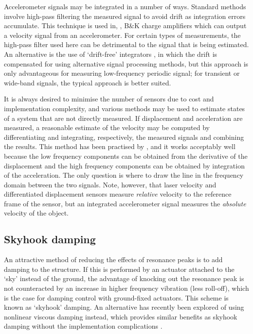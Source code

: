 Accelerometer signals may be integrated in a number of ways.
Standard methods involve high-pass filtering the measured signal to avoid drift as integration errors accumulate.
This technique is used in, \eg, B\&K charge amplifiers which can output a velocity signal from an accelerometer.
For certain types of measurements, the high-pass filter used here can be detrimental to the signal that is being estimated.
An alternative is the use of `drift-free' integrators \cite{gavin1998}, in which the drift is compensated for using alternative signal processing methods, but this approach is only advantageous for measuring low-frequency periodic signal; for transient or wide-band signals, the typical approach is better suited.

It is always desired to minimise the number of sensors due to cost and
implementation complexity, and various methods may be used to estimate
states of a system that are not directly measured.
If displacement and
acceleration are measured, a reasonable estimate of the velocity may
be computed by differentiating and integrating, respectively, the
measured signals and combining the results.
This method has been practised by \textcite{bennett2007}, and it works acceptably well because the low frequency components can be obtained from the derivative of the displacement and the high frequency components can be obtained by integration of the acceleration.
The only question is where to draw the line in the frequency domain between the two signals.
Note, however, that laser velocity and differentiated displacement sensors measure \emph{relative} velocity to the reference frame of the sensor, but an integrated accelerometer signal measures the \emph{absolute} velocity of the object.




\subsection{Skyhook damping}

An attractive method of reducing the effects of resonance peaks is to add
damping to the structure.
If this is performed by an actuator attached to the
`sky' instead of the ground, the advantage of knocking out the resonance peak
is not counteracted by an increase in higher frequency vibration (less
roll-off), which is the case for damping control with ground-fixed actuators.
This scheme is known as `skyhook' damping.
An alternative has recently been explored of using nonlinear viscous damping instead, which provides similar benefits as skyhook damping without the implementation complications \cite{lang2009}.

